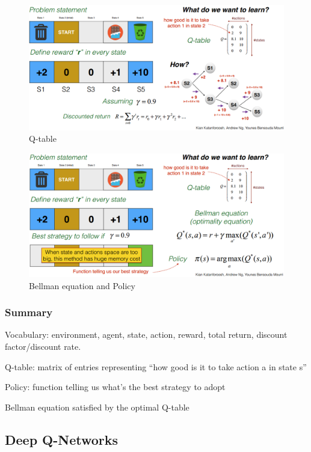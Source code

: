 \begin{figure}[h!] %
	\centering
	\includegraphics[width=1.0\linewidth]{img/recycling_game_1.png}
	\caption{Q-table}\label{img:recycling_game_1}
\end{figure}

\begin{figure}[h!] %
	\centering
	\includegraphics[width=1.0\linewidth]{img/recycling_game_2.png}
	\caption{Bellman equation and Policy}\label{img:recycling_game_1}
\end{figure}

\subsubsection{Summary}
Vocabulary: environment, agent, state, action, reward, total return, 
discount factor/discount rate.

Q-table: matrix of entries representing ``how good is it to take action a
in state s''

Policy: function telling us what's the best strategy to adopt

Bellman equation satisfied by the optimal Q-table


\subsection{Deep Q-Networks}


